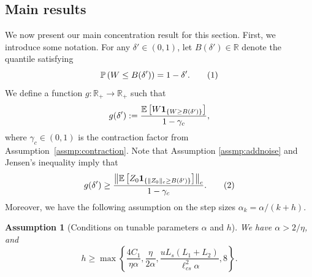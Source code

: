 \documentclass{article}
\newcommand{\numberthis}{\addtocounter{equation}{1}\tag{\theequation}}
\newcommand{\lrset}[1]{\left\{ #1 \right\}}
\newcommand{\lrp}[1]{\left( #1 \right)}
\newcommand{\lrs}[1]{\left[ #1 \right]}
\newcommand{\E}[1]{\mathbb{E}\lrs{#1}}
\newcommand{\R}{\mathbb{R}}
\newcommand{\N}{\mathbb{N}}
\newcommand{\lcs}{\ell_{cs}}
\newtheorem{assmp}{Assumption}
\begin{document}
\subsection{Main results}\label{sec:results_generalnoise}
We now present our main concentration result for this section. First, we introduce some notation. For any $\delta' \in (0,1)$, let $B(\delta') \in \R$ denote the quantile satisfying 
\[\mathbb{P}\lrp{W \le B(\delta')} = 1-\delta'. \numberthis\label{eq:quantile} \]
We define a function $g: \R_+ \to \R_+$ such that
\[ g(\delta'):= \frac{ \E{W {\bf 1}_{\{W \ge B(\delta')\}}} }{1-\gamma_c}, \] 
where $\gamma_c \in (0,1)$ is the contraction factor from Assumption~\ref{assmp:contraction}. Note that Assumption \ref{assmp:addnoise} and Jensen's inequality imply that
\[ g(\delta') \ge \frac{ \left\| \E{Z_0 {\bf 1}_{\{\|Z_0\|_c \ge B(\delta')\}}} \right\|_c }{1-\gamma_c}. \numberthis\label{eq:bias} \] 
Moreover, we have the following assumption on the step sizes $\alpha_k=\alpha/(k+h)$.

\begin{assmp}[Conditions on tunable parameters $\alpha$ and $h$]\label{assmp:stepsize_generalnoise} We have $\alpha> 2/\eta$, and
\[ h \geq \max\lrset{ \frac{4 C_1}{\eta\alpha}, \frac{\eta}{2\alpha}, \frac{u L_s (L_1 + L_2)}{\lcs^2\alpha} , 8}.\]
\end{assmp}

\end{document}

